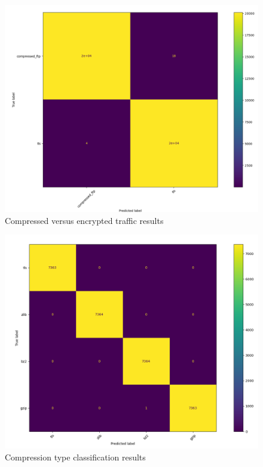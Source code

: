 \begin{figure} [ht!]
\centering
\includegraphics[scale=0.4]{chapters/7/img/compressed_tls.png}
\caption{Compressed versus encrypted traffic results}
\label{fig:tlscomp}
\end{figure}

\begin{figure} [ht!]
\centering
\includegraphics[scale=0.4]{chapters/7/img/encrypted_compressed.png}
\caption{Compression type classification results}
\label{fig:comptype}
\end{figure}


